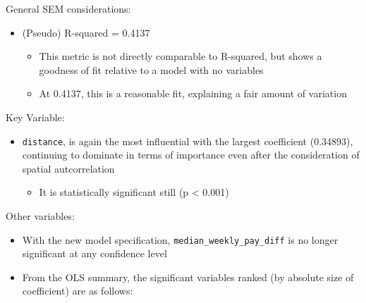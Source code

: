 \documentclass[
  number]{elsarticle}
\providecommand{\tightlist}{%
  \setlength{\itemsep}{0pt}\setlength{\parskip}{0pt}}
\begin{document}
General SEM considerations:

\begin{itemize}
\tightlist
\item
  (Pseudo) R-squared = 0.4137

  \begin{itemize}
  \tightlist
  \item
    This metric is not directly comparable to R-squared, but shows a
    goodness of fit relative to a model with no variables
  \item
    At 0.4137, this is a reasonable fit, explaining a fair amount of
    variation
  \end{itemize}
\end{itemize}

Key Variable:

\begin{itemize}
\tightlist
\item
  \texttt{\textquotesingle{}distance\textquotesingle{}}, is again the
  most influential with the largest coefficient (0.34893), continuing to
  dominate in terms of importance even after the consideration of
  spatial autcorrelation

  \begin{itemize}
  \tightlist
  \item
    It is statistically significant still (p \textless{} 0.001)
  \end{itemize}
\end{itemize}

Other variables:

\begin{itemize}
\tightlist
\item
  With the new model specification,
  \texttt{\textquotesingle{}median\_weekly\_pay\_diff\textquotesingle{}}
  is no longer significant at any confidence level
\item
  From the OLS summary, the significant variables ranked (by absolute
  size of coefficient) are as follows:
\end{itemize}
\end{document}
